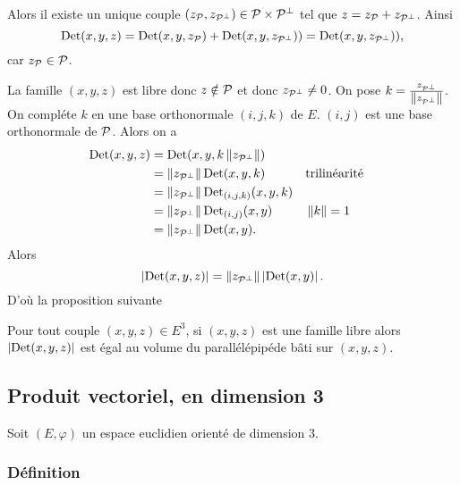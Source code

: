 Alors il existe un unique couple $(z_\P,z_{\P^\perp}) \in \P \times \P^\perp$ tel que $z=z_\P +z_{\P^\perp}$. Ainsi
\begin{equation}
  \Det(x,y,z) = \Det(x,y,z_\P) +\Det(x,y,z_{\P^\perp})) = \Det(x,y,z_{\P^\perp})),
\end{equation}
car $z_\P \in \P$.

La famille $(x,y,z)$ est libre donc $z \notin \P$ et donc $z_{\P^\perp} \neq 0$. On pose $k=\frac{z_{\P^\perp}}{\norme{z_{\P^\perp}}}$. On compléte $k$ en une base orthonormale $(i,j,k)$ de $E$. $(i,j)$ est une base orthonormale de $\P$. Alors on a
\begin{align}
  \Det(x,y,z) &= \Det(x,y,k\norme{z_{\P^\perp}}) \\
  &=\norme{z_{\P^\perp}}\Det(x,y,k) && \text{trilinéarité}\\
  &=\norme{z_{\P^\perp}}\Det_{(i,j,k)}(x,y,k)\\
  &=\norme{z_{\P^\perp}}\Det_{(i,j)}(x,y) && \norme{k}=1\\
  &=\norme{z_{\P^\perp}}\Det(x,y).
\end{align}
Alors
\begin{equation}
  \abs{\Det(x,y,z)} = \norme{z_{\P^\perp}}\abs{\Det(x,y)}.
\end{equation}
D'où la proposition suivante
\begin{prop}
  Pour tout couple $(x,y,z) \in E^3$, si $(x,y,z)$ est une famille libre alors $\abs{\Det(x,y,z)}$ est égal au volume du parallélépipéde bâti sur $(x,y,z)$.
\end{prop}

\subsection{Produit vectoriel, en dimension 3}

Soit $(E,\varphi)$ un espace euclidien orienté de dimension 3.

\subsubsection{Définition}

